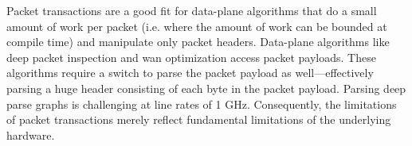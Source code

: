 Packet transactions are a good fit for data-plane algorithms that do a
small amount of work per packet (i.e. where the amount of work can be
bounded at compile time) and manipulate only packet
headers. Data-plane algorithms like deep packet inspection and wan
optimization access packet payloads. These algorithms require a switch
to parse the packet payload as well---effectively parsing a huge
header consisting of each byte in the packet payload. Parsing deep
parse graphs is challenging at line rates of 1 GHz.  Consequently, the limitations of packet
transactions merely reflect fundamental limitations of the underlying
hardware.
